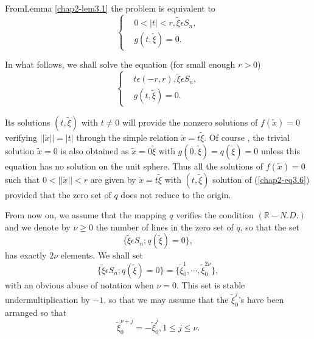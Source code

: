 From\pageoriginale Lemma \ref{chap2-lem3.1} the problem is equivalent
to
\begin{equation*}
\begin{cases}
& 0 < |t| < r, \widetilde{\xi} \epsilon S_{n},\\
& g(t, \widetilde{\xi}) = 0.
\end{cases}
\end{equation*}

In what follows, we shall solve the equation (for small enough $r >
0$)
\begin{equation*}
\begin{cases}
& t \epsilon (-r, r), \widetilde{\xi} \epsilon S_{n},\\
& g(t, \widetilde{\xi}) = 0.
\end{cases}\tag{3.6}\label{chap2-eq3.6}
\end{equation*}

Its solutions $(t, \widetilde{\xi})$ with $t \neq 0$ will provide the
nonzero solutions of $f(\widetilde{x}) = 0$ verifying
$||\widetilde{x}|| = |t|$ through the simple relation $\widetilde{x}
= t \widetilde{\xi}$. Of course , the trivial solution $\widetilde{x}
= 0$ is also obtained as $\widetilde{x} = 0 \widetilde{\xi}$ with
$g(0, \widetilde{\xi}) = q(\widetilde{\xi}) = 0$ unless this equation
has no solution on the unit sphere. Thus all the solutions of
$f(\widetilde{x}) = 0$ such that $0 < ||\widetilde{x}|| < r$ are
given by $\widetilde{x} = t\widetilde{\xi}$ with $(t,
\widetilde{\xi})$ solution of (\ref{chap2-eq3.6}) provided that the
zero set of $q$ does not reduce to the origin.

From now on, we assume that the mapping $q$ verifies the condition
$(\mathbb{R}-N.D.)$ and we denote by $\nu \geq 0$ the number of lines
in the zero set of $q$, so that the set
\begin{equation*}
\{\widetilde{\xi} \epsilon S_{n} ; q(\widetilde{\xi}) = 0 \},\tag{3.7}\label{chap2-3.7}
\end{equation*}
has exactly $2\nu$ elements. We shall set
$$
\{\widetilde{\xi} \epsilon S_{n} ; q(\widetilde{\xi}) = 0 \} =
\{\widetilde{\xi}_{0}^{1}, \cdots, \widetilde{\xi}_{0}^{2\nu}\},
$$
with an obvious abuse of notation when $\nu = 0$. This set is stable
under\pageoriginale multiplication by $-1$, so that we may assume that
the $\widetilde{\xi}_{0}^{j}$'s have been arranged so that
\begin{equation*}
\widetilde{\xi}_{0}^{\nu+j} = -\widetilde{\xi}_{0}^{j}, 1 \leq j \leq \nu.\tag{3.8}\label{chap2-eq3.8}
\end{equation*}

